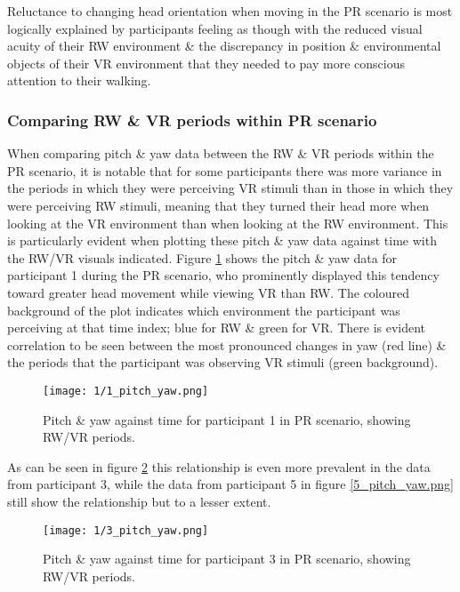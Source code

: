 Reluctance to changing head orientation when moving in the PR scenario is most logically explained by participants feeling as though with the reduced visual acuity of their RW environment \& the discrepancy in position \& environmental objects of their VR environment that they needed to pay more conscious attention to their walking.

\subsubsection{Comparing RW \& VR periods within PR scenario}

When comparing pitch \& yaw data between the RW \& VR periods within the PR scenario, it is notable that for some participants there was more variance in the periods in which they were perceiving VR stimuli than in those in which they were perceiving RW stimuli, meaning that they turned their head more when looking at the VR environment than when looking at the RW environment. This is particularly evident when plotting these pitch \& yaw data against time with the RW/VR visuals indicated. Figure \ref{1_pitch_yaw.png} shows the pitch \& yaw data for participant 1 during the PR scenario, who prominently displayed this tendency toward greater head movement while viewing VR than RW. The coloured background of the plot indicates which environment the participant was perceiving at that time index; blue for RW \& green for VR. There is evident correlation to be seen between the most pronounced changes in yaw (red line) \& the periods that the participant was observing VR stimuli (green background).

\begin{figure}[h]
	\begin{center}
	\texttt{[image: 1/1\_pitch\_yaw.png]}
	\caption{Pitch \& yaw against time for participant 1 in PR scenario, showing RW/VR periods.}
	\label{1_pitch_yaw.png}
	\end{center}
\end{figure}

As can be seen in figure \ref{3_pitch_yaw.png} this relationship is even more prevalent in the data from participant 3, while the data from participant 5 in figure \ref{5_pitch_yaw.png} still show the relationship but to a lesser extent.

\begin{figure}[h]
	\begin{center}
	\texttt{[image: 1/3\_pitch\_yaw.png]}
	\caption{Pitch \& yaw against time for participant 3 in PR scenario, showing RW/VR periods.}
	\label{3_pitch_yaw.png}
	\end{center}
\end{figure}

